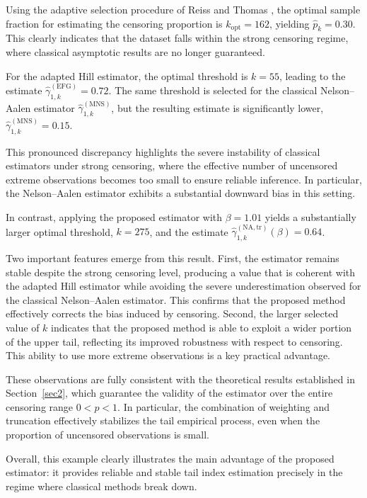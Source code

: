 \documentclass[reqno,openbib,runningheads,a4paper,12pt]{amsart}%
\begin{document}
\noindent Using the adaptive selection procedure of Reiss and Thomas
\citep{ReTo97}, the optimal sample fraction for estimating the censoring
proportion is $k_{\mathrm{opt}}=162$, yielding $\widehat{p}_{k}=0.30$. This
clearly indicates that the dataset falls within the strong censoring regime,
where classical asymptotic results are no longer guaranteed. \smallskip

\noindent For the adapted Hill estimator, the optimal threshold is $k=55$,
leading to the estimate $\widehat{\gamma}_{1,k}^{(\mathrm{EFG})}=0.72$. The
same threshold is selected for the classical Nelson--Aalen estimator
$\widehat{\gamma}_{1,k}^{(\mathrm{MNS})}$, but the resulting estimate is
significantly lower, $\widehat{\gamma}_{1,k}^{(\mathrm{MNS})}=0.15$.
\smallskip

\noindent This pronounced discrepancy highlights the severe instability of
classical estimators under strong censoring, where the effective number of
uncensored extreme observations becomes too small to ensure reliable
inference. In particular, the Nelson--Aalen estimator exhibits a substantial
downward bias in this setting.\smallskip

\noindent In contrast, applying the proposed estimator with $\beta=1.01$
yields a substantially larger optimal threshold, $k=275$, and the estimate
$\widehat{\gamma}_{1,k}^{(\mathrm{NA,tr})}(\beta)=0.64$.\smallskip

\noindent Two important features emerge from this result. First, the estimator
remains stable despite the strong censoring level, producing a value that is
coherent with the adapted Hill estimator while avoiding the severe
underestimation observed for the classical Nelson--Aalen estimator. This
confirms that the proposed method effectively corrects the bias induced by
censoring. Second, the larger selected value of $k$ indicates that the
proposed method is able to exploit a wider portion of the upper tail,
reflecting its improved robustness with respect to censoring. This ability to
use more extreme observations is a key practical advantage.\smallskip

\noindent These observations are fully consistent with the theoretical results
established in Section~\ref{sec2}, which guarantee the validity of the
estimator over the entire censoring range $0<p<1$. In particular, the
combination of weighting and truncation effectively stabilizes the tail
empirical process, even when the proportion of uncensored observations is
small.\smallskip

\noindent Overall, this example clearly illustrates the main advantage of the
proposed estimator: it provides reliable and stable tail index estimation
precisely in the regime where classical methods break down.
\end{document}
